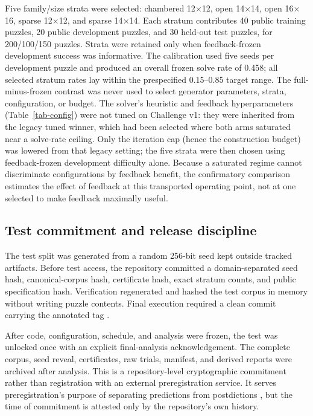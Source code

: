 \documentclass[pdflatex,sn-basic,iicol]{sn-jnl}
\begin{document}
Five family/size strata were selected: chambered 12\(\times\)12, open 14\(\times\)14, open 16\(\times\)16, sparse 12\(\times\)12, and sparse 14\(\times\)14. Each stratum contributes 40 public training puzzles, 20 public development puzzles, and 30 held-out test puzzles, for 200/100/150 puzzles. Strata were retained only when feedback-frozen development success was informative. The calibration used five seeds per development puzzle and produced an overall frozen solve rate of 0.458; all selected stratum rates lay within the prespecified 0.15--0.85 target range. The full-minus-frozen contrast was never used to select generator parameters, strata, configuration, or budget. The solver's heuristic and feedback hyperparameters (Table~\ref{tab-config}) were not tuned on Challenge v1: they were inherited from the legacy tuned winner, which had been selected where both arms saturated near a solve-rate ceiling. Only the iteration cap (hence the construction budget) was lowered from that legacy setting; the five strata were then chosen using feedback-frozen development difficulty alone. Because a saturated regime cannot discriminate configurations by feedback benefit, the confirmatory comparison estimates the effect of feedback at this transported operating point, not at one selected to make feedback maximally useful.

\subsection{Test commitment and release discipline}

The test split was generated from a random 256-bit seed kept outside tracked artifacts. Before test access, the repository committed a domain-separated seed hash, canonical-corpus hash, certificate hash, exact stratum counts, and public specification hash. Verification regenerated and hashed the test corpus in memory without writing puzzle contents. Final execution required a clean commit carrying the annotated tag .

After code, configuration, schedule, and analysis were frozen, the test was unlocked once with an explicit final-analysis acknowledgement. The complete corpus, seed reveal, certificates, raw trials, manifest, and derived reports were archived after analysis. This is a repository-level cryptographic commitment rather than registration with an external preregistration service. It serves preregistration's purpose of separating predictions from postdictions \citep{nosek2018prereg}, but the time of commitment is attested only by the repository's own history.
\end{document}

